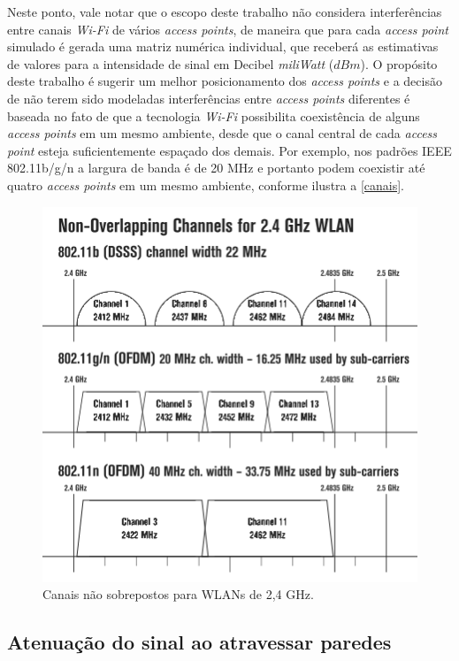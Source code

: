 \documentclass[
	12pt,				%
	twoside,			%
	a4paper,			%
	english,			%
	french,				%
	spanish,			%
	brazil				%
	]{abntex2}
\begin{document}
Neste ponto, vale notar que o escopo deste trabalho não considera
interferências entre canais \emph{Wi-Fi} de vários \emph{access points},
de maneira que para cada \emph{access point} simulado é gerada uma
matriz numérica individual, que receberá as estimativas de valores para
a intensidade de sinal em Decibel \emph{miliWatt} (\(dBm\)). O propósito
deste trabalho é sugerir um melhor posicionamento dos \emph{access
points} e a decisão de não terem sido modeladas interferências entre
\emph{access points} diferentes é baseada no fato de que a tecnologia
\emph{Wi-Fi} possibilita coexistência de alguns \emph{access points} em
um mesmo ambiente, desde que o canal central de cada \emph{access point}
esteja suficientemente espaçado dos demais. Por exemplo, nos padrões
IEEE 802.11b/g/n a largura de banda é de 20 MHz e portanto podem
coexistir até quatro \emph{access points} em um mesmo ambiente, conforme
ilustra a \autoref{canais}.

\begin{figure}[!htb]
    \caption{\label{canais} Canais não sobrepostos para WLANs de 2,4 GHz.}
    \begin{center}
        \includegraphics[scale=0.8]{imagens/canais.png}
    \end{center}
\end{figure}

\subsection{Atenuação do sinal ao atravessar
paredes}\label{atenuauxe7uxe3o-do-sinal-ao-atravessar-paredes}
\end{document}
